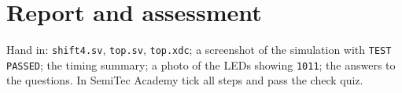 \section{Report and assessment}
Hand in: \texttt{shift4.sv}, \texttt{top.sv}, \texttt{top.xdc}; a screenshot of the simulation with
\texttt{TEST PASSED}; the timing summary; a photo of the LEDs showing \texttt{1011}; the answers to the
questions. In SemiTec Academy tick all steps and pass the check quiz.
\begin{assessment}
\end{assessment}

